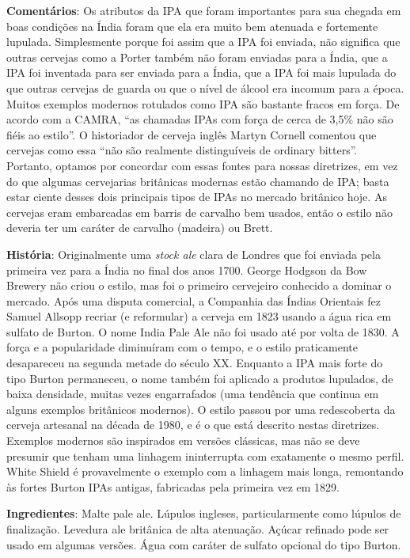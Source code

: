 \textbf{Comentários}: Os atributos da IPA que foram importantes para sua chegada em boas condições na Índia foram que ela era muito bem atenuada e fortemente lupulada. Simplesmente porque foi assim que a IPA foi enviada, não significa que outras cervejas como a Porter também não foram enviadas para a Índia, que a IPA foi inventada para ser enviada para a Índia, que a IPA foi mais lupulada do que outras cervejas de guarda ou que o nível de álcool era incomum para a época. Muitos exemplos modernos rotulados como IPA são bastante fracos em força. De acordo com a CAMRA, “as chamadas IPAs com força de cerca de 3,5\% não são fiéis ao estilo”. O historiador de cerveja inglês Martyn Cornell comentou que cervejas como essa “não são realmente distinguíveis de ordinary bitters”. Portanto, optamos por concordar com essas fontes para nossas diretrizes, em vez do que algumas cervejarias britânicas modernas estão chamando de IPA; basta estar ciente desses dois principais tipos de IPAs no mercado britânico hoje. As cervejas eram embarcadas em barris de carvalho bem usados, então o estilo não deveria ter um caráter de carvalho (madeira) ou Brett.

\textbf{História}: Originalmente uma \textit{stock ale} clara de Londres que foi enviada pela primeira vez para a Índia no final dos anos 1700. George Hodgson da Bow Brewery não criou o estilo, mas foi o primeiro cervejeiro conhecido a dominar o mercado. Após uma disputa comercial, a Companhia das Índias Orientais fez Samuel Allsopp recriar (e reformular) a cerveja em 1823 usando a água rica em sulfato de Burton. O nome India Pale Ale não foi usado até por volta de 1830. A força e a popularidade diminuíram com o tempo, e o estilo praticamente desapareceu na segunda metade do século XX. Enquanto a IPA mais forte do tipo Burton permaneceu, o nome também foi aplicado a produtos lupulados, de baixa densidade, muitas vezes engarrafados (uma tendência que continua em alguns exemplos britânicos modernos). O estilo passou por uma redescoberta da cerveja artesanal na década de 1980, e é o que está descrito nestas diretrizes. Exemplos modernos são inspirados em versões clássicas, mas não se deve presumir que tenham uma linhagem ininterrupta com exatamente o mesmo perfil. White Shield é provavelmente o exemplo com a linhagem mais longa, remontando às fortes Burton IPAs antigas, fabricadas pela primeira vez em 1829.

\textbf{Ingredientes}: Malte pale ale. Lúpulos ingleses, particularmente como lúpulos de finalização. Levedura ale britânica de alta atenuação. Açúcar refinado pode ser usado em algumas versões. Água com caráter de sulfato opcional do tipo Burton.

